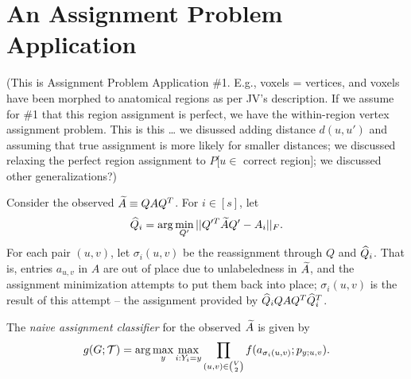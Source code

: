\section{An Assignment Problem Application}


(This is Assignment Problem Application \#1.
E.g., voxels = vertices,
and voxels have been morphed to anatomical regions as per JV's description.
If we assume for \#1 that this region assignment is perfect,
we have the within-region vertex assignment problem.
This is this \dots
we disussed adding distance $d(u,u')$ and assuming that true assignment is more likely for smaller distances;
we discussed relaxing the perfect region assignment to $P[u \in$ correct region$]$;
we discussed other generalizations?)



%
%

Consider the observed $\widetilde{A} \equiv QAQ^T$.
For $i \in [s]$, let
\begin{eqnarray}\label{assignmenteqn}
\widehat{Q}_i = \arg\min_{Q'} ||Q'^T \widetilde{A} Q' - A_i||_F.
\end{eqnarray}
For each pair $(u,v)$, let $\sigma_i(u,v)$ be the reassignment through $Q$ and $\widehat{Q}_i$.
That is, entries $a_{u,v}$ in $A$ are out of place due to unlabeledness in $\widetilde{A}$,
and the assignment minimization attempts to put them back into place;
$\sigma_i(u,v)$ is the result of this attempt -- the assignment provided by
$\widehat{Q}_i Q A Q^T \widehat{Q}_i^T$.




\label{nac}
The {\em naive assignment classifier} for the observed $\widetilde{A}$ is given by
\begin{eqnarray}
g(G;\mathcal{T}) = {\arg\max_y \max_{i:Y_i=y} \prod_{(u,v) \in {V \choose 2}} f(a_{\sigma_i(u,v)};p_{y;u,v})}.
\end{eqnarray}

